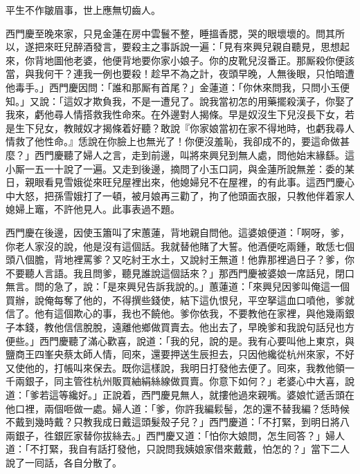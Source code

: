 \begin{myquote}
平生不作皺眉事，世上應無切齒人。
\end{myquote}

西門慶至晚來家，只見金蓮在房中雲鬟不整，睡搵香腮，哭的眼壞壞的。{}問其所以，遂把來旺兒醉酒發言，要殺主之事訴說一遍：「見有來興兒親自聽見，思想起來，你背地圖他老婆，他便背地要你家小娘子。你的皮靴兒沒番正。那厮殺你便該當，與我何干？連我一例也要殺！趁早不為之計，夜頭早晚，人無後眼，只怕暗遭他毒手。」西門慶因問：「誰和那厮有首尾？」金蓮道：「你休來問我，只問小玉便知。」又說：「這奴才欺負我，不是一遭兒了。說我當初怎的用藥擺殺漢子，你娶了我來，虧他尋人情搭救我性命來。在外邊對人揭條。早是奴沒生下兒沒長下女，若是生下兒女，教賊奴才揭條着好聽？{}敢說『你家娘當初在家不得地時，也虧我尋人情救了他性命。』恁說在你臉上也無光了！你便沒羞恥，我卻成不的，要這命做甚麼？」西門慶聽了婦人之言，走到前邊，叫將來興兒到無人處，問他始末緣繇。這小厮一五一十說了一遍。又走到後邊，摘問了小玉口詞，與金蓮所說無差：委的某日，親眼看見雪娥從來旺兒屋裡出來，他媳婦兒不在屋裡，的有此事。這西門慶心中大怒，把孫雪娥打了一頓，被月娘再三勸了，拘了他頭面衣服，只教他伴着家人媳婦上竈，不許他見人。此事表過不題。

西門慶在後邊，因使玉簫叫了宋蕙蓮，背地親自問他。{}這婆娘便道：「啊呀，爹，你老人家沒的說，他是沒有這個話。我就替他賭了大誓。他酒便吃兩鍾，敢恁七個頭八個膽，背地裡罵爹？又吃紂王水土，又說紂王無道！他靠那裡過日子？爹，你不要聽人言語。我且問爹，聽見誰說這個話來？」{}那西門慶被婆娘一席話兒，閉口無言。問的急了，說：「是來興兒告訴我說的。」蕙蓮道：「來興兒因爹叫俺這一個買辦，說俺每奪了他的，不得撰些錢使，結下這仇恨兒，平空拏這血口噴他，爹就信了。他有這個欺心的事，我也不饒他。爹你依我，不要教他在家裡，與他幾兩銀子本錢，教他信信脫脫，遠離他鄉做買賣去。{}他出去了，早晚爹和我說句話兒也方便些。」西門慶聽了滿心歡喜，說道：「我的兒，說的是。我有心要叫他上東京，與鹽商王四峯央蔡太師人情，囘來，還要押送生辰担去，只因他纔從杭州來家，不好又使他的，打帳叫來保去。既你這樣說，我明日打發他去便了。囘來，我教他領一千兩銀子，同主管徃杭州販買紬絹絲線做買賣。你意下如何？」老婆心中大喜，說道：「爹若這等纔好。」正說着，西門慶見無人，就摟他過來親嘴。婆娘忙遞舌頭在他口裡，兩個咂做一處。婦人道：「爹，你許我編鬏髻，怎的還不替我編？{}恁時候不戴到幾時戴？只教我成日戴這頭髮殼子兒？」西門慶道：「不打緊，到明日將八兩銀子，徃銀匠家替你拔絲去。」西門慶又道：「怕你大娘問，怎生囘答？」婦人道：「不打緊，我自有話打發他，只說問我姨娘家借來戴戴，怕怎的？」當下二人說了一囘話，各自分散了。

